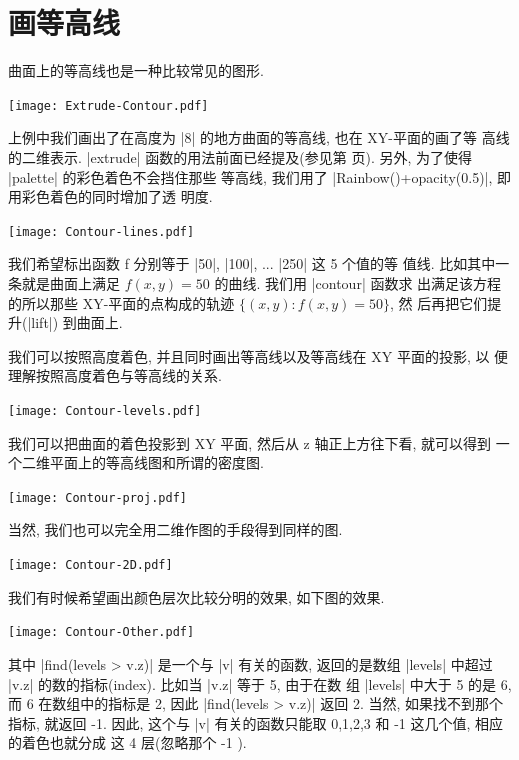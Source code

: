 \documentclass[nofonts,CJKnormalspaces]{ctexbook}
\begin{document}
\section{画等高线}
曲面上的等高线也是一种比较常见的图形.
\begin{center}\texttt{[image: Extrude-Contour.pdf]}\end{center}%

上例中我们画出了在高度为 |8| 的地方曲面的等高线, 也在 XY-平面的画了等
高线的二维表示. |extrude| 函数的用法前面已经提及(参见第
\pageref{extrude} 页). 另外, 为了使得 |palette| 的彩色着色不会挡住那些
等高线, 我们用了 |Rainbow()+opacity(0.5)|, 即用彩色着色的同时增加了透
明度.

\begin{center}\texttt{[image: Contour-lines.pdf]}\end{center}%

我们希望标出函数 f 分别等于 |50|, |100|, ... |250| 这 5 个值的等
值线. 比如其中一条就是曲面上满足 $f(x,y)=50$ 的曲线. 我们用 |contour| 函数求
出满足该方程的所以那些 XY-平面的点构成的轨迹 $\{(x,y):f(x,y)=50\}$, 然
后再把它们提升(|lift|) 到曲面上.

我们可以按照高度着色, 并且同时画出等高线以及等高线在 XY 平面的投影, 以
便理解按照高度着色与等高线的关系.
\begin{center}\texttt{[image: Contour-levels.pdf]}\end{center}%

我们可以把曲面的着色投影到 XY 平面, 然后从 z 轴正上方往下看, 就可以得到
一个二维平面上的等高线图和所谓的密度图.
\begin{center}\texttt{[image: Contour-proj.pdf]}\end{center}%

当然, 我们也可以完全用二维作图的手段得到同样的图.
\begin{center}\texttt{[image: Contour-2D.pdf]}\end{center}%

我们有时候希望画出颜色层次比较分明的效果, 如下图的效果.
\begin{center}\texttt{[image: Contour-Other.pdf]}\end{center}%

其中 |find(levels > v.z)| 是一个与 |v| 有关的函数, 返回的是数组
|levels| 中超过 |v.z| 的数的指标(index). 比如当 |v.z| 等于 5, 由于在数
组 |levels| 中大于 5 的是 6, 而 6 在数组中的指标是 2, 因此
|find(levels > v.z)| 返回 2. 当然, 如果找不到那个指标, 就返回 -1. 因此,
这个与 |v| 有关的函数只能取 0,1,2,3 和 -1 这几个值, 相应的着色也就分成
这 4 层(忽略那个 -1 ).
\end{document}
